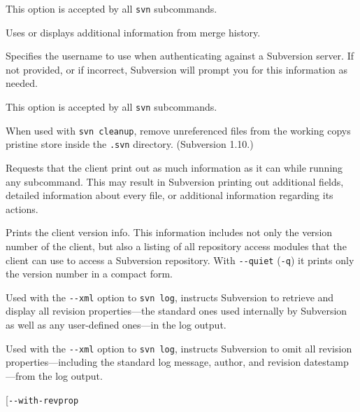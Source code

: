 \begin{description}
This option is accepted by all \texttt{svn} subcommands.
\item[\protect\phantomsection\label{svn.ref.svn.sw.use_merge_history}{}\texttt{-\/-use-merge-history}
(\texttt{-g})]
Uses or displays additional information from merge history.
\item[\protect\phantomsection\label{svn.ref.svn.sw.username}{}\texttt{-\/-username}
\textless NAME\textgreater{}]
Specifies the username to use when authenticating against a Subversion
server. If not provided, or if incorrect, Subversion will prompt you for
this information as needed.

This option is accepted by all \texttt{svn} subcommands.
\item[\protect\phantomsection\label{svn.ref.svn.sw.vacuum_pristines}{}\texttt{-\/-vacuum-pristines}]
When used with \texttt{svn\ cleanup}, remove unreferenced files from the
working copy\textquotesingle s pristine store inside the \texttt{.svn}
directory. (Subversion 1.10.)
\item[\protect\phantomsection\label{svn.ref.svn.sw.verbose}{}\texttt{-\/-verbose}
(\texttt{-v})]
Requests that the client print out as much information as it can while
running any subcommand. This may result in Subversion printing out
additional fields, detailed information about every file, or additional
information regarding its actions.
\item[\protect\phantomsection\label{svn.ref.svn.sw.version}{}\texttt{-\/-version}]
Prints the client version info. This information includes not only the
version number of the client, but also a listing of all repository
access modules that the client can use to access a Subversion
repository. With \texttt{-\/-quiet} (\texttt{-q}) it prints only the
version number in a compact form.
\item[\protect\phantomsection\label{svn.ref.svn.sw.with_all_revprops}{}\texttt{-\/-with-all-revprops}]
Used with the \texttt{-\/-xml} option to \texttt{svn\ log}, instructs
Subversion to retrieve and display all revision properties---the
standard ones used internally by Subversion as well as any user-defined
ones---in the log output.
\item[\protect\phantomsection\label{svn.ref.svn.sw.with_no_revprops}{}\texttt{-\/-with-no-revprops}]
Used with the \texttt{-\/-xml} option to \texttt{svn\ log}, instructs
Subversion to omit all revision properties---including the standard log
message, author, and revision datestamp---from the log output.
\item[\protect{}\label{svn.ref.svn.sw.with_revprop}{}\texttt{-\/-with-revprop}

\end{description}
